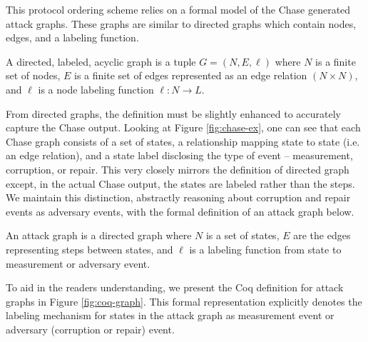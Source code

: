 \documentclass[runningheads]{llncs}
\theoremstyle{definition}
\begin{document}
This protocol ordering scheme relies on a formal model of the Chase generated attack graphs. These graphs are similar to directed graphs which contain nodes, edges, and a labeling function. 

\begin{definition}
    A directed, labeled, acyclic graph is a tuple $ G = (N, E, \ell)$ where $N$ is a finite set of nodes, $E$ is a finite set of edges represented as an edge relation $( N \times N)$, and $\ell$ is a node labeling function $\ell : N \rightarrow L$. 
\end{definition}

From directed graphs, the definition must be slightly enhanced to accurately capture the Chase output. Looking at Figure \ref{fig:chase-ex}, one can see that each Chase graph consists of a set of states, a relationship mapping state to state (i.e. an edge relation), and a state label disclosing the type of event -- measurement, corruption, or repair. This very closely mirrors the definition of directed graph except, in the actual Chase output, the states are labeled rather than the steps. We maintain this distinction, abstractly reasoning about corruption and repair events as adversary events, with the formal definition of an attack graph below. 

\begin{definition}
    An attack graph is a directed graph where $N$ is a set of states, $E$ are the edges representing steps between states, and $\ell$ is a labeling function from state to measurement or adversary event. 
\end{definition}

\noindent To aid in the readers understanding, we present the Coq definition for attack graphs in Figure \ref{fig:coq-graph}. This formal representation explicitly denotes the labeling mechanism for states in the attack graph as measurement event or adversary (corruption or repair) event. 

\end{document}
